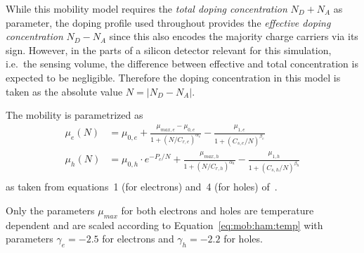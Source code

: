 While this mobility model requires the \emph{total doping concentration} $N_D + N_A$ as parameter, the doping profile used throughout \apsq provides the \emph{effective doping concentration} $N_D - N_A$ since this also encodes the majority charge carriers via its sign.
However, in the parts of a silicon detector relevant for this simulation, i.e.\ the sensing volume, the difference between effective and total concentration is expected to be negligible.
Therefore the doping concentration in this model is taken as the absolute value $N = \left|N_D - N_A\right|$.

The mobility is parametrized as
\begin{equation}
    \label{eq:mob:mas}
    \begin{split}
        \mu_e(N) &= \mu_{0,e} + \frac{\mu_{max,e} - \mu_{0,e}}{1 + (N / C_{r,e})^{\alpha_e}} - \frac{\mu_{1,e}}{1 + (C_{s,e} / N)^{\beta_e}}\\
        \mu_h(N) &= \mu_{0,h} \cdot e^{-P_c / N} + \frac{\mu_{max,h}}{1 + (N / C_{r,h})^{\alpha_h}} - \frac{\mu_{1,h}}{1 + (C_{s,h} / N)^{\beta_h}}\\
\end{split}
\end{equation}
as taken from equations~1 (for electrons) and~4 (for holes) of~\cite{masetti}.

Only the parameters $\mu_{max}$ for both electrons and holes are temperature dependent and are scaled according to Equation~\eqref{eq:mob:ham:temp} with parameters $\gamma_e = -2.5$ for electrons and $\gamma_h = -2.2$ for holes.

